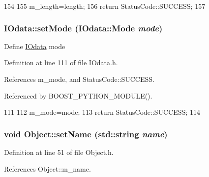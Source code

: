 \begin{DoxyCode}
154                                   {
155     m_length=length;
156     return StatusCode::SUCCESS;
157   }
\end{DoxyCode}
\hypertarget{classIOdata_ad81e9fd3f2cd9dcaffd9eabddf8f867e}{
\subsubsection[{setMode}]{ IOdata::setMode ({\bf IOdata::Mode} {\em mode})}}
\label{classIOdata_ad81e9fd3f2cd9dcaffd9eabddf8f867e}
Define \hyperlink{classIOdata}{IOdata} mode 

Definition at line 111 of file IOdata.h.

References m\_\-mode, and StatusCode::SUCCESS.

Referenced by BOOST\_\-PYTHON\_\-MODULE().


\begin{DoxyCode}
111                                      {
112     m_mode=mode;
113     return StatusCode::SUCCESS;
114   }
\end{DoxyCode}
\hypertarget{classObject_ae30fea75683c2d149b6b6d17c09ecd0c}{
\subsubsection[{setName}]{\setlength{\rightskip}{0pt plus 5cm}void Object::setName (std::string {\em name})}}
\label{classObject_ae30fea75683c2d149b6b6d17c09ecd0c}


Definition at line 51 of file Object.h.

References Object::m\_\-name.

